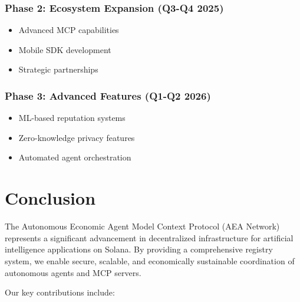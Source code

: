 \documentclass[12pt,a4paper]{article}
\begin{document}
\subsubsection{Phase 2: Ecosystem Expansion (Q3-Q4 2025)}
\begin{itemize}
\item Advanced MCP capabilities
\item Mobile SDK development
\item Strategic partnerships
\end{itemize}

\subsubsection{Phase 3: Advanced Features (Q1-Q2 2026)}
\begin{itemize}
\item ML-based reputation systems
\item Zero-knowledge privacy features
\item Automated agent orchestration
\end{itemize}

\section{Conclusion}

The Autonomous Economic Agent Model Context Protocol (AEA Network) represents a significant advancement in decentralized infrastructure for artificial intelligence applications on Solana. By providing a comprehensive registry system, we enable secure, scalable, and economically sustainable coordination of autonomous agents and MCP servers.

Our key contributions include:
\end{document}
